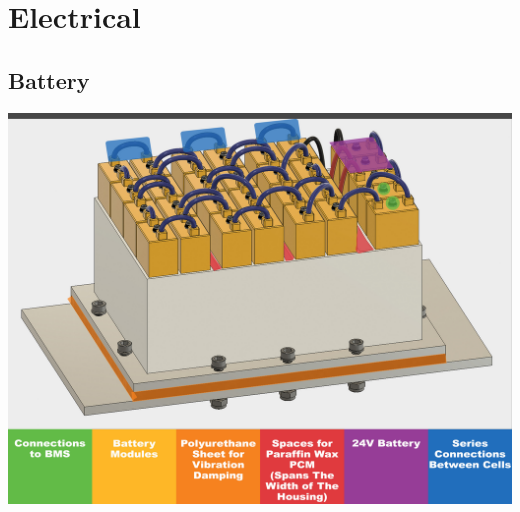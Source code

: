 \documentclass[main.tex]{subfiles}
\begin{document}
    \section{Electrical}

    \subsection{Battery}
      \includegraphics[width=\linewidth]{images/battery_description.jpg}
\end{document}
